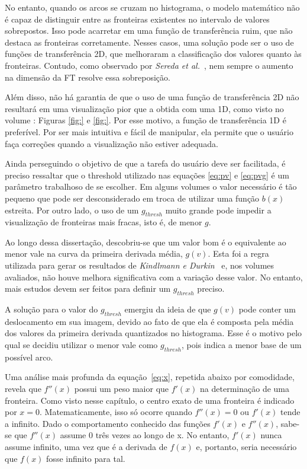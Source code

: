 	No entanto, quando os arcos se cruzam no histograma, o modelo matemático não é capaz de distinguir entre as fronteiras existentes no intervalo de valores sobrepostos. Isso pode acarretar em uma função de transferência ruim, que não destaca as fronteiras corretamente. Nesses casos, uma solução pode ser o uso de funções de transferência 2D, que melhoraram a classificação dos valores quanto às fronteiras. Contudo, como observado por \textit{Sereda et al.}~\cite{sereda1}, nem sempre o aumento na dimensão da FT resolve essa sobreposição.
	
	Além disso, não há garantia de que o uso de uma função de transferência 2D não resultará em uma visualização pior que a obtida com uma 1D, como visto no volume : Figuras \ref{fig:} e \ref{fig:}. Por esse motivo, a função de transferência 1D é preferível. Por ser mais intuitiva e fácil de manipular, ela permite que o usuário faça correções quando a visualização não estiver adequada.
	
	Ainda perseguindo o objetivo de que a tarefa do usuário deve ser facilitada, é preciso ressaltar que o threshold utilizado nas equações \eqref{eq:pv} e \eqref{eq:pvg} é um parâmetro trabalhoso de se escolher. Em alguns volumes o valor necessário é tão pequeno que pode ser desconsiderado em troca de utilizar uma função $ b(x) $ estreita. Por outro lado, o uso de um $ g_{thresh} $ muito grande pode impedir a visualização de fronteiras mais fracas, isto é, de menor $ g $.
	
	Ao longo dessa dissertação, descobriu-se que um valor bom é o equivalente ao menor vale na curva da primeira derivada média, $ g(v) $. Esta foi a regra utilizada para gerar os resultados de \textit{Kindlmann e Durkin}~\cite{gordon} e, nos volumes avaliados, não houve melhora significativa com a variação desse valor. No entanto, mais estudos devem ser feitos para definir um $ g_{thresh} $ preciso.
	
	A solução para o valor do $ g_{thresh} $ emergiu da ideia de que $ g(v) $ pode conter um deslocamento em sua imagem, devido ao fato de que ela é composta pela média dos valores da primeira derivada quantizados no histograma. Esse é o motivo pelo qual se decidiu utilizar o menor vale como $ g_{thresh} $, pois indica a menor base de um possível arco.
	
    Uma análise mais profunda da equação~\eqref{eq:x}, repetida abaixo por comodidade, revela que $ f''(x) $ possui um peso maior que $ f'(x) $ na determinação de uma fronteira. Como visto nesse capítulo, o centro exato de uma fronteira é indicado por $ x = 0 $. Matematicamente, isso só ocorre quando $ f''(x) = 0 $ ou $ f'(x) $ tende a infinito. Dado o comportamento conhecido das funções $ f'(x) $ e $ f''(x) $, sabe-se que $ f''(x) $ assume $ 0 $ três vezes ao longo de x. No entanto, $ f'(x) $ nunca assume infinito, uma vez que é a derivada de $ f(x) $ e, portanto, seria necessário que $ f(x) $ fosse infinito para tal.
    \\
    

